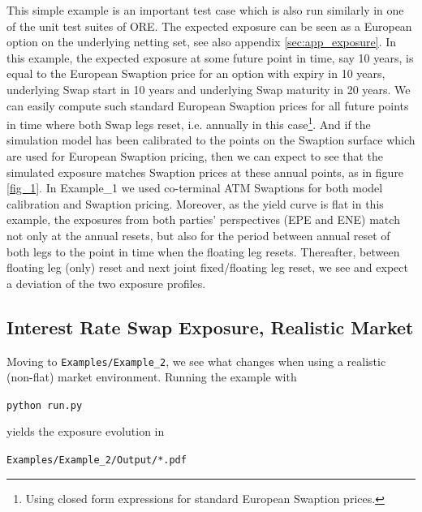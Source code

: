 \documentclass[12pt, a4paper]{article}
\begin{document}
This simple example is an important test case which is also run similarly in one of the unit test suites of ORE. The
expected exposure can be seen as a European option on the underlying netting set, see also appendix
\ref{sec:app_exposure}. In this example, the expected exposure at some future point in time, say 10 years, is equal to
the European Swaption price for an option with expiry in 10 years, underlying Swap start in 10 years and underlying Swap
maturity in 20 years. We can easily compute such standard European Swaption prices for all future points in time where
both Swap legs reset, i.e. annually in this case\footnote{Using closed form expressions for standard European Swaption
  prices.}. And if the simulation model has been calibrated to the points on the Swaption surface which are used for
European Swaption pricing, then we can expect to see that the simulated exposure matches Swaption prices at these annual
points, as in figure \ref{fig_1}.  In Example\_1 we used co-terminal ATM Swaptions for both model calibration and
Swaption pricing. Moreover, as the yield curve is flat in this example, the exposures from both parties'
perspectives (EPE and ENE) match not only at the annual resets, but also for the period between annual reset of both
legs to the point in time when the floating leg resets. Thereafter, between floating leg (only) reset and next joint
fixed/floating leg reset, we see and expect a deviation of the two exposure profiles.

\subsection{Interest Rate Swap Exposure, Realistic Market}\label{sec:example2}

Moving to {\tt Examples/Example\_2}, we see what changes when using a realistic (non-flat) market
environment. Running the example with

\medskip
\centerline{\tt python run.py } 
\medskip

yields the exposure evolution in 

\medskip
\centerline{\tt Examples/Example\_2/Output/*.pdf } 
\medskip
\end{document}
